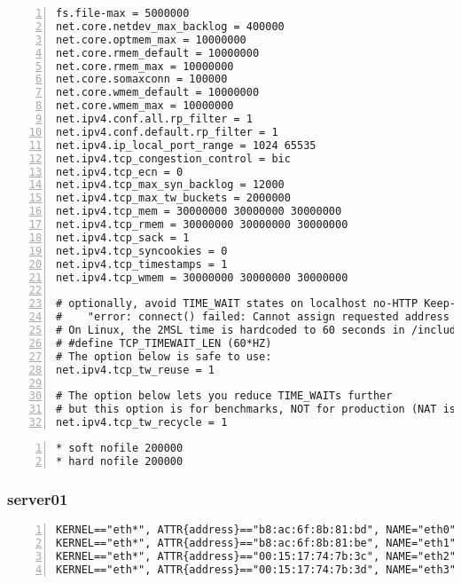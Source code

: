 \documentclass[Configuration]{subfiles}
\begin{document}
\begin{lstlisting}[frame=single,caption=Lines add to /etc/sysctl.conf,backgroundcolor=\color{gray},breaklines=true,numbers=left,]
fs.file-max = 5000000
net.core.netdev_max_backlog = 400000
net.core.optmem_max = 10000000
net.core.rmem_default = 10000000
net.core.rmem_max = 10000000
net.core.somaxconn = 100000
net.core.wmem_default = 10000000
net.core.wmem_max = 10000000
net.ipv4.conf.all.rp_filter = 1
net.ipv4.conf.default.rp_filter = 1
net.ipv4.ip_local_port_range = 1024 65535
net.ipv4.tcp_congestion_control = bic
net.ipv4.tcp_ecn = 0
net.ipv4.tcp_max_syn_backlog = 12000
net.ipv4.tcp_max_tw_buckets = 2000000
net.ipv4.tcp_mem = 30000000 30000000 30000000
net.ipv4.tcp_rmem = 30000000 30000000 30000000
net.ipv4.tcp_sack = 1
net.ipv4.tcp_syncookies = 0
net.ipv4.tcp_timestamps = 1
net.ipv4.tcp_wmem = 30000000 30000000 30000000    

# optionally, avoid TIME_WAIT states on localhost no-HTTP Keep-Alive tests:
#    "error: connect() failed: Cannot assign requested address (99)"
# On Linux, the 2MSL time is hardcoded to 60 seconds in /include/net/tcp.h:
# #define TCP_TIMEWAIT_LEN (60*HZ)
# The option below is safe to use:
net.ipv4.tcp_tw_reuse = 1

# The option below lets you reduce TIME_WAITs further
# but this option is for benchmarks, NOT for production (NAT issues)
net.ipv4.tcp_tw_recycle = 1
\end{lstlisting}

\begin{lstlisting}[frame=single,caption=Lines added to /etc/security/limits.conf,backgroundcolor=\color{gray},breaklines=true,numbers=left,]
* soft nofile 200000
* hard nofile 200000
\end{lstlisting}

\subsubsection{server01}
\label{sec:server01_configuration}

\begin{lstlisting}[frame=single,caption=/etc/udev/rules.d/70-persistent-net.rules,backgroundcolor=\color{gray},breaklines=true,numbers=left,]
KERNEL=="eth*", ATTR{address}=="b8:ac:6f:8b:81:bd", NAME="eth0"
KERNEL=="eth*", ATTR{address}=="b8:ac:6f:8b:81:be", NAME="eth1"
KERNEL=="eth*", ATTR{address}=="00:15:17:74:7b:3c", NAME="eth2"
KERNEL=="eth*", ATTR{address}=="00:15:17:74:7b:3d", NAME="eth3"
\end{lstlisting}
\end{document}
